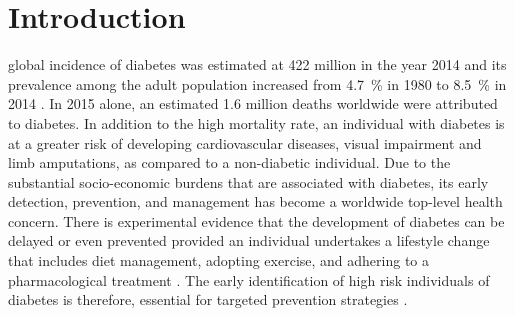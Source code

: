 \documentclass[journal,comsoc]{IEEEtran}
\renewcommand{\^}{\hat}  %
\begin{document}
\section{Introduction}
%
%
%
%
 global incidence of diabetes was estimated at \num{422} million in the year \num{2014} and its prevalence among the adult population increased from \SI{4.7}{\percent} in \num{1980} to \SI{8.5}{\percent} in \num{2014} \cite{mathers_projections_2006}. In \num{2015} alone, an estimated \num{1.6} million deaths worldwide were attributed to diabetes. In addition to the high mortality rate, an individual with diabetes is at a greater risk of developing cardiovascular diseases, visual impairment and limb amputations, as compared to a non-diabetic individual. Due to the substantial socio-economic burdens that are associated with diabetes, its early detection, prevention, and management has become a worldwide top-level health concern. There is experimental evidence that the development of diabetes can be delayed or even prevented provided an individual undertakes a lifestyle change that includes diet management, adopting exercise, and adhering to a pharmacological treatment \cite{tuomilehto2001prevention}. The early identification of high risk individuals of diabetes is therefore, essential for targeted prevention strategies \cite{diabetes2015long}.
\end{document}
